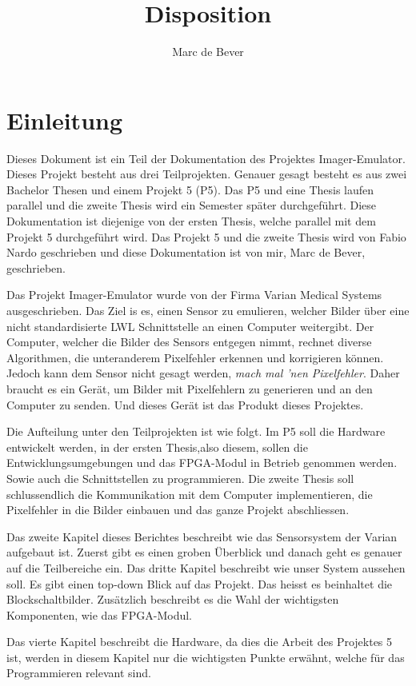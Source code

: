 \documentclass{article}
\title{Disposition}
\author{Marc de Bever}
\begin{document}
\maketitle
\tableofcontents

\section{Einleitung}
Dieses Dokument ist ein Teil der Dokumentation des Projektes Imager-Emu\-lator. Dieses Projekt besteht aus drei Teilprojekten. 
Genauer gesagt besteht es aus zwei Bachelor Thesen und einem Projekt 5 (P5). 
Das P5 und eine Thesis laufen parallel und die zweite Thesis wird ein Semester später durchgeführt. Diese Dokumentation ist diejenige von der ersten Thesis, welche parallel mit dem Projekt 5 durchgeführt wird. Das Projekt 5 und die zweite Thesis wird von Fabio Nardo geschrieben und diese Dokumentation ist von mir, Marc de Bever, geschrieben. 

Das Projekt Imager-Emulator wurde von der Firma Varian Medical Systems ausgeschrieben. Das Ziel is es, einen Sensor zu emulieren, welcher Bilder über eine nicht standardisierte LWL Schnittstelle an einen Computer weitergibt. Der Computer, welcher die Bilder des Sensors entgegen nimmt, rechnet diverse Algorithmen, die unteranderem Pixelfehler erkennen und korrigieren können. Jedoch kann dem Sensor nicht gesagt werden, \textit{mach mal 'nen Pixelfehler}. Daher braucht es ein Gerät, um Bilder mit Pixelfehlern zu generieren und an den Computer zu senden. Und dieses Gerät ist das Produkt dieses Projektes.

Die Aufteilung unter den Teilprojekten ist wie folgt. Im P5 soll die Hardware entwickelt werden, in der ersten Thesis,also diesem, sollen die Entwicklungsumgebungen und das FPGA-Modul in Betrieb genommen werden. Sowie auch die Schnittstellen zu programmieren. Die zweite Thesis soll schlussendlich die Kommunikation mit dem Computer implementieren, die Pixelfehler in die Bilder einbauen und das ganze Projekt abschliessen.

Das zweite Kapitel dieses Berichtes beschreibt wie das Sensorsystem der Varian aufgebaut ist. Zuerst gibt es einen groben Überblick und danach geht es genauer auf die Teilbereiche ein.
Das dritte Kapitel beschreibt wie unser System aussehen soll. Es gibt einen top-down Blick auf das Projekt. Das heisst es beinhaltet die Blockschaltbilder. Zusätzlich beschreibt es die Wahl der wichtigsten Komponenten, wie das FPGA-Modul.

Das vierte Kapitel beschreibt die Hardware, da dies die Arbeit des Projektes 5 ist, werden in diesem Kapitel nur die wichtigsten Punkte erwähnt, welche für das Programmieren relevant sind.
\end{document}
